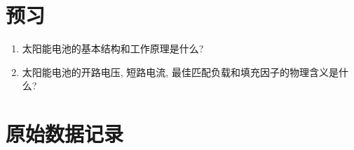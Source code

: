 \documentclass[signature=data]{physicsreport}
\begin{document}
\maketitle

\section{预习}
\begin{enumerate}
    \item 太阳能电池的基本结构和工作原理是什么?
    \item 太阳能电池的开路电压, 短路电流, 最佳匹配负载和填充因子的物理含义是什么?
\end{enumerate}

\makeatletter
{}
\makeatother

\newpage
\section{原始数据记录}
\end{document}
